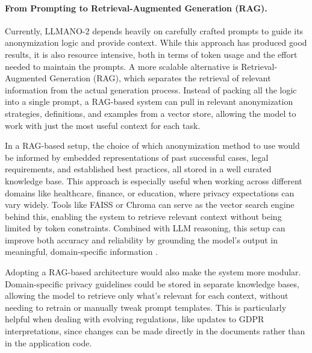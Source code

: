 \documentclass{article}
\begin{document}
\paragraph{From Prompting to Retrieval-Augmented Generation (RAG).}
Currently, LLMANO-2 depends heavily on carefully crafted prompts to guide its anonymization logic and provide context. While this approach has produced good results, it is also resource intensive, both in terms of token usage and the effort needed to maintain the prompts. A more scalable alternative is Retrieval-Augmented Generation (RAG), which separates the retrieval of relevant information from the actual generation process. Instead of packing all the logic into a single prompt, a RAG-based system can pull in relevant anonymization strategies, definitions, and examples from a vector store, allowing the model to work with just the most useful context for each task.

In a RAG-based setup, the choice of which anonymization method to use would be informed by embedded representations of past successful cases, legal requirements, and established best practices, all stored in a well curated knowledge base. This approach is especially useful when working across different domains like healthcare, finance, or education, where privacy expectations can vary widely. Tools like FAISS \cite{faiss2023} or Chroma can serve as the vector search engine behind this, enabling the system to retrieve relevant context without being limited by token constraints. Combined with LLM reasoning, this setup can improve both accuracy and reliability by grounding the model’s output in meaningful, domain-specific information \cite{llm_content_analysis}.

Adopting a RAG-based architecture would also make the system more modular. Domain-specific privacy guidelines could be stored in separate knowledge bases, allowing the model to retrieve only what’s relevant for each context, without needing to retrain or manually tweak prompt templates. This is particularly helpful when dealing with evolving regulations, like updates to GDPR interpretations, since changes can be made directly in the documents rather than in the application code.
\end{document}
